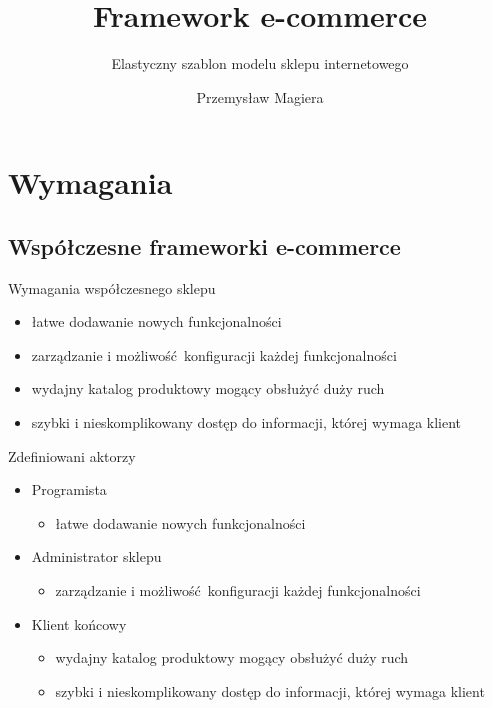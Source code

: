 \documentclass[polish,xcolor=table,9pt,aspectratio=1610,hyperref={pdfpagemode=FullScreen}]{beamer}
\title{Framework e-commerce}
\subtitle{Elastyczny szablon modelu sklepu internetowego}
\author{Przemysław Magiera}
\begin{document}
\frame{\titlepage}

\section{Wymagania}
\subsection{Współczesne frameworki e-commerce}

\begin{frame}{Wymagania współczesnego sklepu}
\begin{itemize}
\item<1-> łatwe dodawanie nowych funkcjonalności 
\item<1-> zarządzanie i możliwość konfiguracji każdej funkcjonalności
\item<1-> wydajny katalog produktowy mogący obsłużyć duży ruch
\item<1-> szybki i nieskomplikowany dostęp do informacji, której wymaga klient

\end{itemize}
\end{frame}

\begin{frame}{Zdefiniowani aktorzy}
\begin{itemize}
	\item<1-> Programista
	\begin{itemize}
		\item<1-> łatwe dodawanie nowych funkcjonalności
	\end{itemize}
	\item<1-> Administrator sklepu
	\begin{itemize}
		\item<1-> zarządzanie i możliwość konfiguracji każdej funkcjonalności
	\end{itemize}
	\item<1-> Klient końcowy
	\begin{itemize}
		\item<1-> wydajny katalog produktowy mogący obsłużyć duży ruch
		\item<1-> szybki i nieskomplikowany dostęp do informacji, której wymaga klient
	\end{itemize}
	
\end{itemize}
\end{frame}
\end{document}

